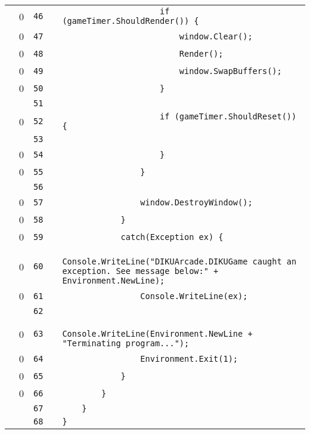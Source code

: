 \documentclass[a4paper,landscape,10pt]{article}
\begin{document}
\begin{longtable}[l]{lrrll}
\cellcolor{red} & 0 & \verb~46~ & & \verb~                    if (gameTimer.ShouldRender()) {~\\
\cellcolor{red} & 0 & \verb~47~ & & \verb~                        window.Clear();~\\
\cellcolor{red} & 0 & \verb~48~ & & \verb~                        Render();~\\
\cellcolor{red} & 0 & \verb~49~ & & \verb~                        window.SwapBuffers();~\\
\cellcolor{red} & 0 & \verb~50~ & & \verb~                    }~\\
\cellcolor{gray} &  & \verb~51~ & & \verb~~\\
\cellcolor{red} & 0 & \verb~52~ & & \verb~                    if (gameTimer.ShouldReset()) {~\\
\cellcolor{gray} &  & \verb~53~ & & \verb~~\\
\cellcolor{red} & 0 & \verb~54~ & & \verb~                    }~\\
\cellcolor{red} & 0 & \verb~55~ & & \verb~                }~\\
\cellcolor{gray} &  & \verb~56~ & & \verb~~\\
\cellcolor{red} & 0 & \verb~57~ & & \verb~                window.DestroyWindow();~\\
\cellcolor{red} & 0 & \verb~58~ & & \verb~            }~\\
\cellcolor{red} & 0 & \verb~59~ & & \verb~            catch(Exception ex) {~\\
\cellcolor{red} & 0 & \verb~60~ & & \verb~                Console.WriteLine("DIKUArcade.DIKUGame caught an exception. See message below:" + Environment.NewLine);~\\
\cellcolor{red} & 0 & \verb~61~ & & \verb~                Console.WriteLine(ex);~\\
\cellcolor{gray} &  & \verb~62~ & & \verb~~\\
\cellcolor{red} & 0 & \verb~63~ & & \verb~                Console.WriteLine(Environment.NewLine + "Terminating program...");~\\
\cellcolor{red} & 0 & \verb~64~ & & \verb~                Environment.Exit(1);~\\
\cellcolor{red} & 0 & \verb~65~ & & \verb~            }~\\
\cellcolor{red} & 0 & \verb~66~ & & \verb~        }~\\
\cellcolor{gray} &  & \verb~67~ & & \verb~    }~\\
\cellcolor{gray} &  & \verb~68~ & & \verb~}~\\
\end{longtable}
\newpage
\end{document}
